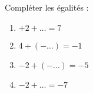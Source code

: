 
\begin{exercice}\label{exosmath-0723}

Compléter les égalités :
\begin{enumerate}
    \item
        \( +2+\ldots=7\)
    \item
        \( 4+(-\ldots)=-1\)
    \item
        \( -2+(-\ldots)=-5\)
    \item
        \( -2+\ldots=-7\)
\end{enumerate}

\end{exercice}
